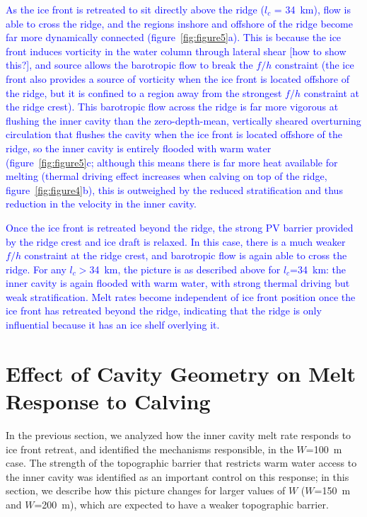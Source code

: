 \documentclass[draft]{agujournal2019}
\begin{document}
\textcolor{blue}{As the ice front is retreated to sit directly above the ridge ($l_c$ = 34~km), flow is able to cross the ridge, and the regions inshore and offshore of the ridge become far more dynamically connected (figure~\ref{fig:figure5}a). This is because the ice front induces vorticity in the water column through lateral shear [how to show this?], and source allows the barotropic flow to break the $f/h$ constraint (the ice front also provides a source of vorticity when the ice front is located offshore of the ridge, but it is confined to a region away from the strongest $f/h$ constraint at the ridge crest). This barotropic flow across the ridge is far more vigorous at flushing the inner cavity than the zero-depth-mean, vertically sheared overturning circulation that flushes the cavity when the ice front is located offshore of the ridge, so the inner cavity is entirely flooded with warm water (figure~\ref{fig:figure5}c; although this means there is far more heat available for melting (thermal driving effect increases when calving on top of the ridge, figure~\ref{fig:figure4}b), this is outweighed by the reduced stratification and thus reduction in the velocity in the inner cavity.}


\textcolor{blue}{Once the ice front is retreated beyond the ridge, the strong PV barrier provided by the ridge crest and ice draft is relaxed. In this case, there is a much weaker $f/h$ constraint at the ridge crest, and barotropic flow is again able to cross the ridge. For any $l_c>$34~km, the picture is as described above for $l_c$=34~km: the inner cavity is again flooded with warm water, with strong thermal driving but weak stratification. Melt rates become independent of ice front position once the ice front has retreated beyond the ridge, indicating that the ridge is only influential because it has an ice shelf overlying it.}


\section{Effect of Cavity Geometry on Melt Response to Calving}\label{S:Results:H}
In the previous section, we analyzed how the inner cavity melt rate responds to ice front retreat, and identified the mechanisms responsible, in the $W$=100~m case. The strength of the topographic barrier that restricts warm water access to the inner cavity was identified as an important control on this response; in this section, we describe how this picture changes for larger values of $W$ ($W$=150~m and $W$=200~m), which are expected to have a weaker topographic barrier.
\end{document}
